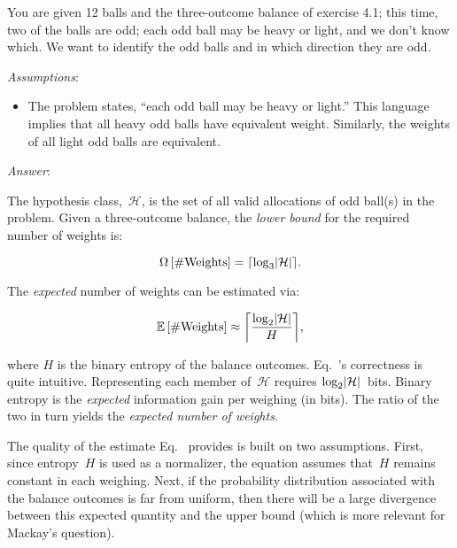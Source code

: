 \begin{problem}{4}{14}
  You are given 12 balls and the three-outcome balance of exercise 4.1; this time, two of the balls are odd; each odd ball may be heavy or light, and we don't know which.  We want to identify the odd balls and in which direction they are odd.
\end{problem}

  \noindent
  \textit{Assumptions}:

  \begin{itemize}
    \item The problem states, ``each odd ball may be heavy or light.'' This language implies that all heavy odd balls have equivalent weight.  Similarly, the weights of all light odd balls are equivalent.
  \end{itemize}

  \noindent
  \textit{Answer}:

  The hypothesis class,~$\mathcal{H}$, is the set of all valid allocations of odd ball(s) in the problem. Given a three-outcome balance, the \textit{lower bound} for the required number of weights is:

  \begin{equation}
    \Omega\left[\#\text{Weights}\right] = \ceil*{\log_{3} \abs{\mathcal{H}}} \text{.}
  \end{equation}

  \noindent
  The \textit{expected} number of weights can be estimated via:

  \begin{equation}\label{eq:p1NumbWeightsRequired}
    \mathbb{E}\left[\#\text{Weights}\right] \approx \ceil*{\frac{\log_{2} \abs{\mathcal{H}}}{H}} \text{,}
  \end{equation}

  \noindent
  where $H$ is the binary entropy of the balance outcomes.  Eq.~'s correctness is quite intuitive. Representing each member of~$\mathcal{H}$ requires ${\log_{2}\lvert\mathcal{H}\rvert}$~bits.  Binary entropy is the \textit{expected} information gain per weighing (in bits).  The ratio of the two in turn yields the \textit{expected number of weights}.

  The quality of the estimate Eq.~ provides is built on two assumptions.  First, since entropy~$H$ is used as a normalizer, the equation assumes that~$H$ remains constant in each weighing.  Next, if the probability distribution associated with the balance outcomes is far from uniform, then there will be a large divergence between this expected quantity and the upper bound (which is more relevant for Mackay's question).

